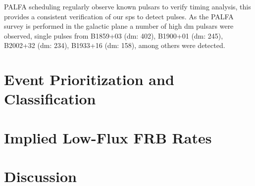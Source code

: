 \documentclass[a4paper,fleqn,usenatbib]{mnras}
\begin{document}


PALFA scheduling regularly observe known pulsars to verify timing analysis,
this provides a consistent verification of our \gls*{sps} to detect
pulses. As the PALFA survey is performed in the galactic plane a number of high
\gls*{dm} pulsars were observed, single pulses from B1859+03 (\gls*{dm}: 402),
B1900+01 (\gls*{dm}: 245), B2002+32 (\gls*{dm}: 234), B1933+16 (\gls*{dm}: 158),
among others were detected.



\section{Event Prioritization and Classification}
\label{sec:event_classify}


\section{Implied Low-Flux FRB Rates}
\label{sec:frb_rates}


\section{Discussion}
\label{sec:discuss}

\end{document}
